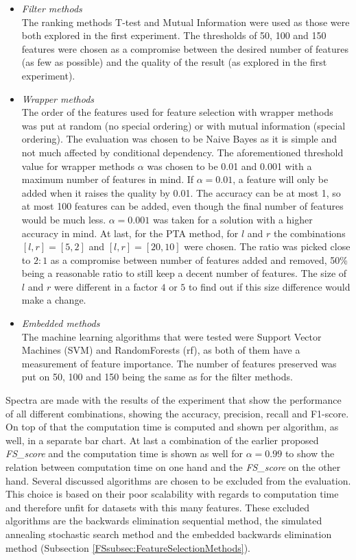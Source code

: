 \documentclass[10pt,a4paper]{report}
\begin{document}
	\begin{itemize}
		\item \textit{Filter methods} \\
		The ranking methods T-test and Mutual Information were used as those were both explored in the first experiment. The thresholds of 50, 100 and 150 features were chosen as a compromise between the desired number of features (as few as possible) and the quality of the result (as explored in the first experiment).
		\item \textit{Wrapper methods} \\
		The order of the features used for feature selection with wrapper methods was put at random (no special ordering) or with mutual information (special ordering). The evaluation was chosen to be Naive Bayes as it is simple and not much affected by conditional dependency. The aforementioned threshold value for wrapper methods $\alpha$ was chosen to be 0.01 and 0.001 with a maximum number of features in mind. If $\alpha= 0.01$, a feature will only be added when it raises the quality by 0.01. The accuracy can be at most 1, so at most 100 features can be added, even though the final number of features would be much less. $\alpha = 0.001$ was taken for a solution with a higher accuracy in mind. At last, for the PTA method, for $l$ and $r$ the combinations $[l, r] = [5, 2]$ and $[l, r] = [20, 10]$ were chosen. The ratio was picked close to $2:1$ as a compromise between number of features added and removed, 50\% being a reasonable ratio to still keep a decent number of features. The size of $l$ and $r$ were different in a factor $4$ or $5$ to find out if this size difference would make a change.
		\item \textit{Embedded methods} \\
		The machine learning algorithms that were tested were Support Vector Machines (SVM) and RandomForests (rf), as both of them have a measurement of feature importance. The number of features preserved was put on 50, 100 and 150 being the same as for the filter methods.
		
		
	\end{itemize}
	Spectra are made with the results of the experiment that show the performance of all different combinations, showing the accuracy, precision, recall and F1-score. On top of that the computation time is computed and shown per algorithm, as well, in a separate bar chart. At last a combination of the earlier proposed \textit{FS\_score} and the computation time is shown as well for $\alpha = 0.99$ to show the relation between computation time on one hand and the \textit{FS\_score} on the other hand. 
	Several discussed algorithms  are chosen to be excluded from the evaluation. This choice is based on their poor scalability with regards to computation time and therefore unfit for datasets with this many features. These excluded algorithms are the backwards elimination sequential method, the simulated annealing stochastic search method and the embedded backwards elimination method (Subsection \ref{FSsubsec:FeatureSelectionMethods}). 
	
\end{document}
